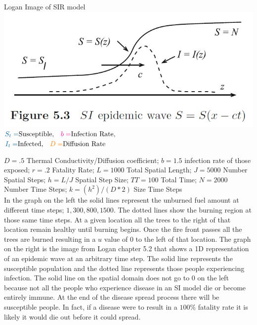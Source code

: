\documentclass{article}
\begin{document}
    \hfill
    \begin{minipage}[t]{.49\textwidth}
    \centering Logan Image of SIR model
     \includegraphics[scale=0.60]{1D_epidemic_from_book.jpg}
     $\textcolor{MidnightBlue}{S_t=}\text{Susceptible,}\quad\textcolor{magenta}{b=}\text{Infection Rate,}$\\
    $\textcolor{MidnightBlue}{I_t=} \text{Infected,}\quad\textcolor{orange}{D=}\text{Diffusion Rate}$
    \end{minipage}

    $D = .5$ Thermal Conductivity/Diffusion coefficient; $b = 1.5$ infection rate of those exposed; $r = .2$  Fatality Rate;  
    $L = 1000$ Total Spatial Length; $J = 5000$ Number Spatial Steps; $h = L/J$ Spatial Step Size; $TT = 100$ Total Time; $N=2000$ Number Time Steps; $k = (h^2)/(D*2)$ Size Time Steps
\vspace{.5cm}    \\
In the graph on the left the solid lines represent the unburned fuel amount at different time steps; $1,300,800,1500$. The dotted lines show the burning region at those same time steps. At a given location all the trees to the right of that location remain healthy until burning begins.  Once the fire front passes all the trees are burned resulting in a $u$ value of $0$ to the left of that location.  The graph on the right is the image from Logan chapter 5.2 that shows a 1D representation of an epidemic wave at an arbitrary time step.  The solid line represents the susceptible population and the dotted line represents those people experiencing infection.  The solid line on the spatial domain does not go to $0$ on the left because not all the people who experience disease in an SI model die or become entirely immune.  At the end of the disease spread process there will be susceptible people.  In fact, if a disease were to result in a $100\%$ fatality rate it is likely it would die out before it could spread.  \\
\end{document}
